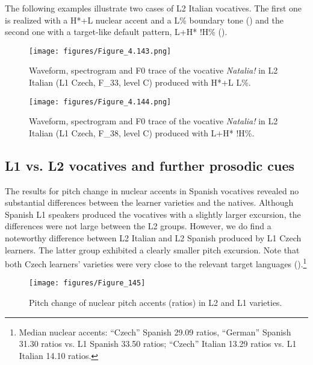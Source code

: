 The following examples illustrate two cases of L2 Italian vocatives. The first one is realized with a H*+L nuclear accent and a L\% boundary tone () and the second one with a target-like default pattern, L+H* !H\% ().

\begin{figure}


\texttt{[image: figures/Figure\_4.143.png]}



\caption{Waveform, spectrogram and F0 trace of the vocative \textit{Natalia!} in L2 Italian (L1 Czech, F\_33, level C) produced with H*+L L\%.}
\label{fig:4.143}
\end{figure}

\begin{figure}


\texttt{[image: figures/Figure\_4.144.png]}



\caption{Waveform, spectrogram and F0 trace of the vocative \textit{Natalia!} in L2 Italian (L1 Czech, F\_38, level C) produced with L+H* !H\%.}
\label{fig:4.144}
\end{figure}

\subsection{L1 vs. L2 vocatives and further prosodic cues}\label{sec:4.5.4}

The results for pitch change in nuclear accents in Spanish vocatives revealed no substantial differences between the learner varieties and the natives. Although Spanish L1 speakers produced the vocatives with a slightly larger excursion, the differences were not large between the L2 groups. However, we do find a noteworthy difference between L2 Italian and L2 Spanish produced by L1 Czech learners. The latter group exhibited a clearly smaller pitch excursion. Note that both Czech learners’ varieties were very close to the relevant target languages ().\footnote{Median nuclear accents: “Czech” Spanish 29.09 ratios, “German” Spanish 31.30 ratios vs. L1 Spanish 33.50 ratios; “Czech” Italian 13.29 ratios vs. L1 Italian 14.10 ratios.}

\begin{figure}


\texttt{[image: figures/Figure\_145]}



\caption{Pitch change of nuclear pitch accents (ratios) in L2 and L1 varieties.}
\label{fig:4.145}
\end{figure}

